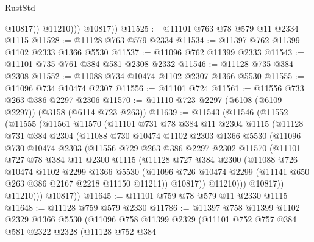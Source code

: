 \begin{lexlean}{RustStd}
\begin{coremodule}
{\begin{coremodule}
{{{{{{{{{{{{{{{{{{{{{{{{{{                  @10817))
              @11210)))
        @10817))
@11525 := @11101 @763 @78 @579 @11 @2334 @1115
@11528 := @11128 @763 @579 @2334
@11534 := @11397 @762 @11399 @1102 @2333 @1366 @5530
@11537 := @11096 @762 @11399 @2333
@11543 := @11101 @735 @761 @384 @581 @2308 @2332
@11546 := @11128 @735 @384 @2308
@11552 := @11088 @734 @10474 @1102 @2307 @1366 @5530
@11555 := @11096 @734 @10474 @2307
@11556 := @11101 @724
@11561 := @11556 @733 @263 @386 @2297 @2306
@11570 := @11110 @723 @2297 (@6108 (@6109 @2297)) (@3158 (@6114 @723 @263))
@11639 := @11543
    (@11546
      (@11552
        (@11555
          (@11561
            @11570
            (@11101
              @731
              @78
              @384
              @11
              @2304
              @1115
              (@11128
                @731
                @384
                @2304
                (@11088
                  @730
                  @10474
                  @1102
                  @2303
                  @1366
                  @5530
                  (@11096
                    @730
                    @10474
                    @2303
                    (@11556
                      @729
                      @263
                      @386
                      @2297
                      @2302
                      @11570
                      (@11101
                        @727
                        @78
                        @384
                        @11
                        @2300
                        @1115
                        (@11128
                          @727
                          @384
                          @2300
                          (@11088
                            @726
                            @10474
                            @1102
                            @2299
                            @1366
                            @5530
                            (@11096
                              @726
                              @10474
                              @2299
                              (@11141 @650 @263 @386 @2167 @2218 @11150 @11211))
                            @10817))
                        @11210)))
                  @10817))
              @11210)))
        @10817))
@11645 := @11101 @759 @78 @579 @11 @2330 @1115
@11648 := @11128 @759 @579 @2330
@11786 := @11397
    @758
    @11399
    @1102
    @2329
    @1366
    @5530
    (@11096
      @758
      @11399
      @2329
      (@11101
        @752
        @757
        @384
        @581
        @2322
        @2328
        (@11128
          @752
          @384
}}}}}}}}}}}}}}}}}}}}}}}}}}
\end{coremodule}}
\end{coremodule}
\end{lexlean}
